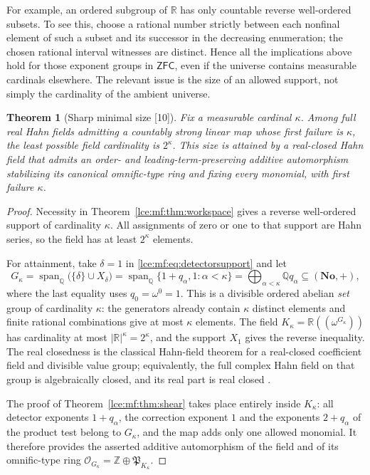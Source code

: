 \documentclass[11pt,letterpaper]{article}
\numberwithin{equation}{section}
\newtheorem{theorem}{Theorem}[section]
\theoremstyle{definition}
\theoremstyle{remark}
\newcommand{\No}{\mathbf{No}}
\newcommand{\R}{\mathbb R}
\newcommand{\Q}{\mathbb Q}
\newcommand{\Z}{\mathbb Z}
\newcommand{\abs}[1]{\lvert#1\rvert}
\newcommand{\ZFC}{\mathsf{ZFC}}
\newcommand{\thref}[1]{Theorem~\ref{#1}}
\newcommand{\src}[1]{\textup{\textsf{\small[#1]}}}%
\newcommand{\Span}{\operatorname{span}_{\Q}}
\newcommand{\Hahn}[1]{\R((\omega^{#1}))}
\begin{document}
For example, an ordered subgroup of $\R$ has only countable reverse
well-ordered subsets. To see this, choose a rational number strictly
between each nonfinal element of such a subset and its successor in the
decreasing enumeration; the chosen rational interval witnesses are distinct.
Hence all the implications above hold for those exponent groups in $\ZFC$,
even if the universe contains measurable cardinals elsewhere. The relevant
issue is the size of an allowed support, not simply the cardinality of the
ambient universe.

\begin{theorem}[Sharp minimal size \src{10}]\label{lce:mf:thm:size}
Fix a measurable cardinal $\kappa$. Among full real Hahn fields admitting a
countably strong linear map whose first failure is $\kappa$, the least
possible field cardinality is $2^\kappa$. This size is attained by a
real-closed Hahn field that admits an order- and leading-term-preserving
additive automorphism stabilizing its canonical omnific-type ring and
fixing every monomial, with first failure $\kappa$.
\end{theorem}
\begin{proof}
Necessity in \thref{lce:mf:thm:workspace} gives a reverse well-ordered
support of cardinality $\kappa$. All assignments of zero or one to that
support are Hahn series, so the field has at least $2^\kappa$ elements.

For attainment, take $\delta=1$ in \eqref{lce:mf:eq:detectorsupport} and let
\[
 G_\kappa=\Span\bigl(\{\delta\}\cup X_\delta\bigr)
   =\Span\{1+q_\alpha,1:\alpha<\kappa\}
   =\bigoplus_{\alpha<\kappa}\Q q_\alpha\subseteq(\No,+),
\]
where the last equality uses $q_0=\omega^0=1$. This is a divisible ordered
abelian \emph{set} group of cardinality $\kappa$: the generators already
contain $\kappa$ distinct elements and finite rational combinations give at
most $\kappa$ elements. The field $K_\kappa=\Hahn{G_\kappa}$ has cardinality
at most $\abs\R^\kappa=2^\kappa$, and the support $X_1$ gives the reverse
inequality. The real closedness is the classical Hahn-field theorem for a
real-closed coefficient field and divisible value group; equivalently, the
full complex Hahn field on that group is algebraically closed, and its real
part is real closed \cite{Gonshor,Kaplansky}.

The proof of \thref{lce:mf:thm:shear} takes place entirely inside
$K_\kappa$: all detector exponents $1+q_\alpha$, the correction exponent $1$
and the exponents $2+q_\alpha$ of the product test belong to $G_\kappa$, and
the map adds only one allowed monomial. It therefore provides the asserted
additive automorphism of the field and of its omnific-type ring
$\mathcal O_{G_\kappa}=\Z\oplus\mathfrak P_{K_\kappa}$.
\end{proof}
\end{document}
